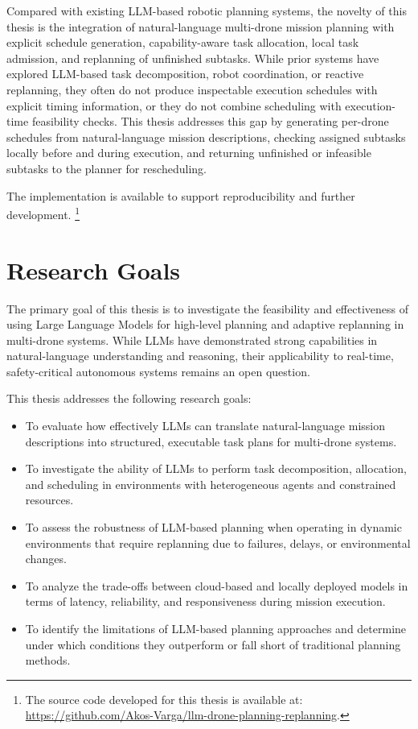 Compared with existing LLM-based robotic planning systems, the novelty of this thesis is the
integration of natural-language multi-drone mission planning with explicit schedule generation,
capability-aware task allocation, local task admission, and replanning of unfinished subtasks.
While prior systems have explored LLM-based task decomposition, robot coordination, or reactive
replanning, they often do not produce inspectable execution schedules with explicit timing
information, or they do not combine scheduling with execution-time feasibility checks. This thesis
addresses this gap by generating per-drone schedules from natural-language mission descriptions,
checking assigned subtasks locally before and during execution, and returning unfinished or
infeasible subtasks to the planner for rescheduling.

The implementation is available to support reproducibility and further development.
\footnote{The source code developed for this thesis is available at: 
\url{https://github.com/Akos-Varga/llm-drone-planning-replanning}.}

\section{Research Goals}

The primary goal of this thesis is to investigate the feasibility and effectiveness of using
Large Language Models for high-level planning and adaptive replanning in multi-drone systems.
While LLMs have demonstrated strong capabilities in natural-language understanding and reasoning,
their applicability to real-time, safety-critical autonomous systems remains an open question.

This thesis addresses the following research goals:

\begin{itemize}
    \item To evaluate how effectively LLMs can translate natural-language mission descriptions into structured,
    executable task plans for multi-drone systems.
    
    \item To investigate the ability of LLMs to perform task decomposition, allocation, and scheduling in environments
    with heterogeneous agents and constrained resources.
    
    \item To assess the robustness of LLM-based planning when operating in dynamic environments that require
    replanning due to failures, delays, or environmental changes.
    
    \item To analyze the trade-offs between cloud-based and locally deployed models in terms of latency, reliability,
    and responsiveness during mission execution.
    
    \item To identify the limitations of LLM-based planning approaches and determine under which conditions they
    outperform or fall short of traditional planning methods.
\end{itemize}

